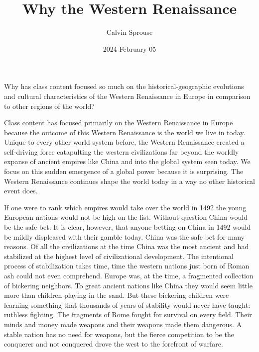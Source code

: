 \documentclass[a4paper, 12pt]{article}
\title{Why the Western Renaissance}
\author{Calvin Sprouse}
\affil{Geography 101 World Regional Geography}
\date{2024 February 05}
\begin{document}
\maketitle


\doublespacing\noindent
Why has class content focused so much on the historical-geographic evolutions and cultural characteristics of the Western Renaissance in Europe in comparison to other regions of the world?
\vspace*{1\baselineskip}

Class content has focused primarily on the Western Renaissance in Europe because the outcome of this Western Renaissance is the world we live in today. Unique to every other world system before, the Western Renaissance created a self-driving force catapulting the western civilizations far beyond the worldly expanse of ancient empires like China and into the global system seen today. We focus on this sudden emergence of a global power because it is surprising. The Western Renaissance continues shape the world today in a way no other historical event does.

If one were to rank which empires would take over the world in 1492 the young European nations would not be high on the list. Without question China would be the safe bet. It is clear, however, that anyone betting on China in 1492 would be mildly displeased with their gamble today. China was the safe bet for many reasons. Of all the civilizations at the time China was the most ancient and had stabilized at the highest level of civilizational development. The intentional process of stabilization takes time, time the western nations just born of Roman ash could not even comprehend. Europe was, at the time, a fragmented collection of bickering neighbors. To great ancient nations like China they would seem little more than children playing in the sand. But these bickering children were learning something that thousands of years of stability would never have taught: ruthless fighting. The fragments of Rome fought for survival on every field. Their minds and money made weapons and their weapons made them dangerous. A stable nation has no need for weapons, but the fierce competition to be the conquerer and not conquered drove the west to the forefront of warfare.
\end{document}
